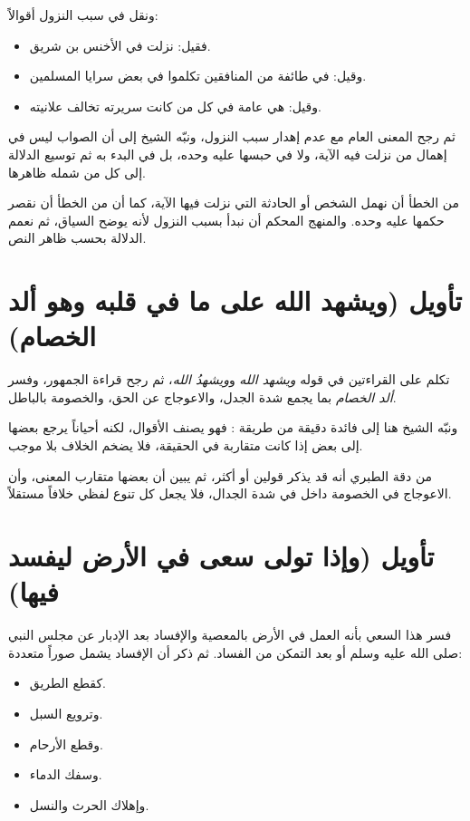 ونقل  في سبب النزول أقوالاً:
\begin{itemize}
    \item فقيل: نزلت في الأخنس بن شريق.
    \item وقيل: في طائفة من المنافقين تكلموا في بعض سرايا المسلمين.
    \item وقيل: هي عامة في كل من كانت سريرته تخالف علانيته.
\end{itemize}

ثم رجح المعنى العام مع عدم إهدار سبب النزول، ونبّه الشيخ إلى أن الصواب ليس في إهمال من نزلت فيه الآية، ولا في حبسها عليه وحده، بل في البدء به ثم توسيع الدلالة إلى كل من شمله ظاهرها.

\begin{fawaid}
من الخطأ أن نهمل الشخص أو الحادثة التي نزلت فيها الآية، كما أن من الخطأ أن نقصر حكمها عليه وحده. والمنهج المحكم أن نبدأ بسبب النزول لأنه يوضح السياق، ثم نعمم الدلالة بحسب ظاهر النص.
\end{fawaid}

\section{تأويل (ويشهد الله على ما في قلبه وهو ألد الخصام)}
تكلم  على القراءتين في قوله \textit{ويشهد الله} و\textit{ويشهدُ الله}، ثم رجح قراءة الجمهور، وفسر \textit{ألد الخصام} بما يجمع شدة الجدل، والاعوجاج عن الحق، والخصومة بالباطل.

ونبّه الشيخ هنا إلى فائدة دقيقة من طريقة : فهو يصنف الأقوال، لكنه أحياناً يرجع بعضها إلى بعض إذا كانت متقاربة في الحقيقة، فلا يضخم الخلاف بلا موجب.

\begin{fawaid}
من دقة الطبري أنه قد يذكر قولين أو أكثر، ثم يبين أن بعضها متقارب المعنى، وأن الاعوجاج في الخصومة داخل في شدة الجدال، فلا يجعل كل تنوع لفظي خلافاً مستقلاً.
\end{fawaid}

\section{تأويل (وإذا تولى سعى في الأرض ليفسد فيها)}
فسر  هذا السعي بأنه العمل في الأرض بالمعصية والإفساد بعد الإدبار عن مجلس النبي صلى الله عليه وسلم أو بعد التمكن من الفساد. ثم ذكر أن الإفساد يشمل صوراً متعددة:
\begin{itemize}
    \item كقطع الطريق.
    \item وترويع السبل.
    \item وقطع الأرحام.
    \item وسفك الدماء.
    \item وإهلاك الحرث والنسل.
\end{itemize}

